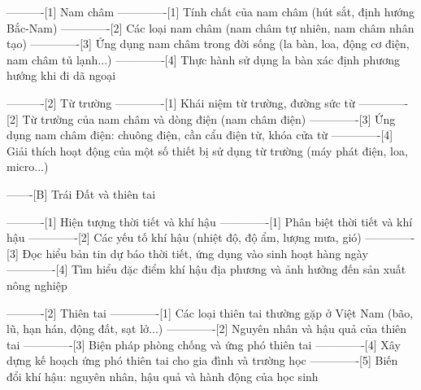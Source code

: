 ----------[1] Nam châm
-------------[1] Tính chất của nam châm (hút sắt, định hướng Bắc-Nam)
-------------[2] Các loại nam châm (nam châm tự nhiên, nam châm nhân tạo)
-------------[3] Ứng dụng nam châm trong đời sống (la bàn, loa, động cơ điện, nam châm tủ lạnh...)
-------------[4] Thực hành sử dụng la bàn xác định phương hướng khi đi dã ngoại

----------[2] Từ trường
-------------[1] Khái niệm từ trường, đường sức từ
-------------[2] Từ trường của nam châm và dòng điện (nam châm điện)
-------------[3] Ứng dụng nam châm điện: chuông điện, cần cẩu điện từ, khóa cửa từ
-------------[4] Giải thích hoạt động của một số thiết bị sử dụng từ trường (máy phát điện, loa, micro...)

-------[B] Trái Đất và thiên tai

----------[1] Hiện tượng thời tiết và khí hậu
-------------[1] Phân biệt thời tiết và khí hậu
-------------[2] Các yếu tố khí hậu (nhiệt độ, độ ẩm, lượng mưa, gió)
-------------[3] Đọc hiểu bản tin dự báo thời tiết, ứng dụng vào sinh hoạt hàng ngày
-------------[4] Tìm hiểu đặc điểm khí hậu địa phương và ảnh hưởng đến sản xuất nông nghiệp

----------[2] Thiên tai
-------------[1] Các loại thiên tai thường gặp ở Việt Nam (bão, lũ, hạn hán, động đất, sạt lở...)
-------------[2] Nguyên nhân và hậu quả của thiên tai
-------------[3] Biện pháp phòng chống và ứng phó thiên tai
-------------[4] Xây dựng kế hoạch ứng phó thiên tai cho gia đình và trường học
-------------[5] Biến đổi khí hậu: nguyên nhân, hậu quả và hành động của học sinh